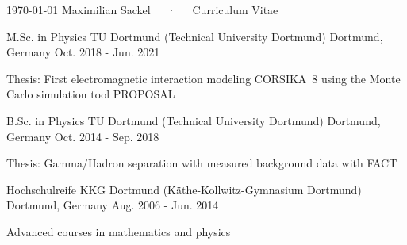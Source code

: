 \documentclass[11pt, a4paper]{Awesome-CV/awesome-cv}
\begin{document}
\makecvheader

\makecvfooter
{\today}
{Maximilian Sackel~~~·~~~Curriculum Vitae}
{\thepage}



\begin{cventries}
    \cventry
    {M.Sc. in Physics} %
    {TU Dortmund (Technical University Dortmund)} %
    {Dortmund, Germany} %
    {Oct. 2018 - Jun. 2021} %
    {
        \begin{cvitems} %
        \item {Thesis: First electromagnetic interaction modeling CORSIKA~8 using the Monte Carlo simulation tool PROPOSAL}
        \end{cvitems}
    }%

    \cventry
    {B.Sc. in Physics} %
    {TU Dortmund (Technical University Dortmund)} %
    {Dortmund, Germany} %
    {Oct. 2014 - Sep. 2018} %
    {
        \begin{cvitems} %
        \item {Thesis: Gamma/Hadron separation with measured background data with FACT}
        \end{cvitems}
    }%

    \cventry
    {Hochschulreife} %
    {KKG Dortmund (Käthe-Kollwitz-Gymnasium Dortmund)} %
    {Dortmund, Germany} %
    {Aug. 2006 - Jun. 2014} %
    {
        \begin{cvitems} %
        \item {Advanced courses in mathematics and physics}
        \end{cvitems}
    }%
\end{cventries}
\end{document}

